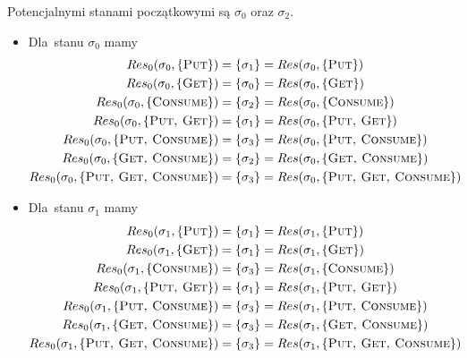 \documentclass[11pt,a4paper]{article}
\begin{document}
Potencjalnymi stanami początkowymi są $\sigma_0$ oraz $\sigma_2$.

\begin{itemize}
    \item Dla~stanu $\sigma_0$ mamy
    \begin{align*}
        Res_0(\sigma_0, \{ \textsc{Put} \}) &= \{ \sigma_1 \} = Res(\sigma_0, \{ \textsc{Put} \}) \\
        Res_0(\sigma_0, \{ \textsc{Get} \}) &= \{ \sigma_0 \} = Res(\sigma_0, \{ \textsc{Get} \}) \\
        Res_0(\sigma_0, \{ \textsc{Consume} \}) &= \{ \sigma_2 \} = Res(\sigma_0, \{ \textsc{Consume} \}) \\
        Res_0(\sigma_0, \{ \textsc{Put, Get} \}) &= \{ \sigma_1 \} = Res(\sigma_0, \{ \textsc{Put, Get} \}) \\
        Res_0(\sigma_0, \{ \textsc{Put, Consume} \}) &= \{ \sigma_3 \} = Res(\sigma_0, \{ \textsc{Put, Consume} \}) \\
        Res_0(\sigma_0, \{ \textsc{Get, Consume} \}) &= \{ \sigma_2 \} = Res(\sigma_0, \{ \textsc{Get, Consume} \}) \\
        Res_0(\sigma_0, \{ \textsc{Put, Get, Consume} \}) &= \{ \sigma_3 \} = Res(\sigma_0, \{ \textsc{Put, Get, Consume} \})
    \end{align*}
    
    \item Dla~stanu $\sigma_1$ mamy
    \begin{align*}
        Res_0(\sigma_1, \{ \textsc{Put} \}) &= \{ \sigma_1 \} = Res(\sigma_1, \{ \textsc{Put} \}) \\
        Res_0(\sigma_1, \{ \textsc{Get} \}) &= \{ \sigma_1 \} = Res(\sigma_1, \{ \textsc{Get} \}) \\
        Res_0(\sigma_1, \{ \textsc{Consume} \}) &= \{ \sigma_3 \} = Res(\sigma_1, \{ \textsc{Consume} \}) \\
        Res_0(\sigma_1, \{ \textsc{Put, Get} \}) &= \{ \sigma_1 \} = Res(\sigma_1, \{ \textsc{Put, Get} \}) \\
        Res_0(\sigma_1, \{ \textsc{Put, Consume} \}) &= \{ \sigma_3 \} = Res(\sigma_1, \{ \textsc{Put, Consume} \}) \\
        Res_0(\sigma_1, \{ \textsc{Get, Consume} \}) &= \{ \sigma_3 \} = Res(\sigma_1, \{ \textsc{Get, Consume} \}) \\
        Res_0(\sigma_1, \{ \textsc{Put, Get, Consume} \}) &= \{ \sigma_3 \} = Res(\sigma_1, \{ \textsc{Put, Get, Consume} \})
    \end{align*}
    

\end{itemize}
\end{document}
